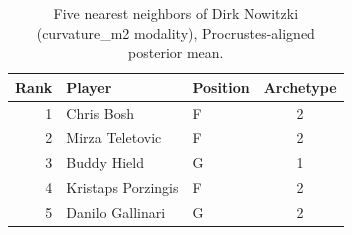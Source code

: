 \begin{table}[htbp]
  \centering\small
  \begin{tabular}{rllc}
    \toprule
    Rank & Player & Position & Archetype \\
    \midrule
    1 & Chris Bosh & F & 2 \\
    2 & Mirza Teletovic & F & 2 \\
    3 & Buddy Hield & G & 1 \\
    4 & Kristaps Porzingis & F & 2 \\
    5 & Danilo Gallinari & G & 2 \\
    \bottomrule
  \end{tabular}
  \caption{Five nearest neighbors of Dirk Nowitzki (curvature_m2 modality), Procrustes-aligned posterior mean.}
  \label{tab:Dirk_Nowitzki_neighbors_curvature_m2}
\end{table}


